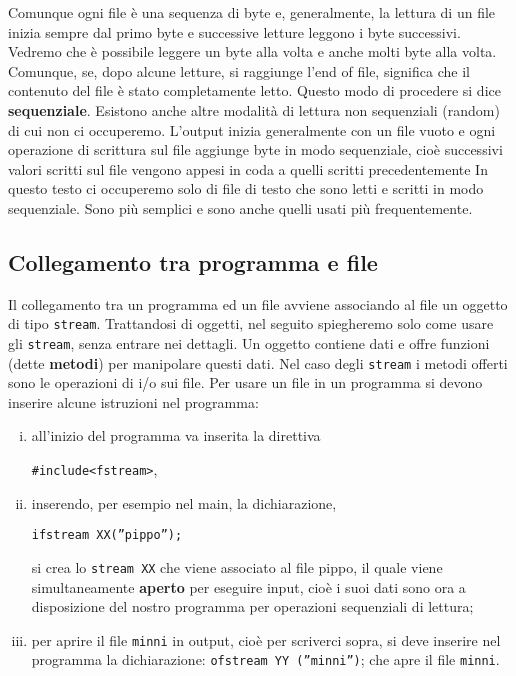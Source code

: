 \documentclass[a4paper,12pt]{book}
\begin{document}
Comunque ogni file è una sequenza di byte e, generalmente, la lettura di un file inizia sempre dal primo byte e successive letture leggono i byte successivi. Vedremo che è possibile leggere un byte alla volta e anche molti byte alla volta. Comunque, se, dopo alcune letture, si raggiunge l'end of file, significa che il contenuto del file è stato completamente letto.
Questo modo di procedere si dice \textbf{sequenziale}.
Esistono anche altre modalità di lettura non sequenziali (random) di cui non ci occuperemo.
L'output inizia generalmente con un file vuoto e ogni operazione di scrittura sul file aggiunge byte in modo sequenziale, cioè successivi valori scritti sul file vengono appesi in coda a quelli scritti precedentemente In questo testo ci occuperemo solo di file di testo che sono letti e scritti in modo sequenziale. Sono più semplici e sono anche quelli usati più frequentemente.

\subsection{Collegamento tra programma e file}
Il collegamento tra un programma ed un file avviene associando al file un oggetto di tipo \texttt{stream}.
Trattandosi di oggetti, nel seguito spiegheremo solo come usare gli \texttt{stream}, senza entrare nei dettagli.
Un oggetto contiene dati e offre funzioni (dette \textbf{metodi}) per manipolare questi dati.
Nel caso degli \texttt{stream} i metodi offerti sono le operazioni di i/o sui file.
Per usare un file in un programma si devono inserire alcune istruzioni nel programma: 

\begin{enumerate}[i)]
\item all'inizio del programma va inserita la direttiva

\texttt{\#include<fstream>},

\item inserendo, per esempio nel main, la dichiarazione,

\texttt{ifstream XX(''pippo'');}
			
\noindent si crea lo \texttt{stream XX} che viene associato al file pippo, il quale vie­ne simultaneamente \textbf{aperto} per eseguire input, cioè i suoi dati sono ora a disposizione del nostro programma per operazioni sequenziali di lettura;

\item per aprire il file \texttt{minni} in output, cioè per scriverci sopra, si deve inserire nel programma la dichiarazione: \texttt{ofstream YY (''minni'')}; che apre il file \texttt{minni}.
\end{enumerate}
\end{document}
